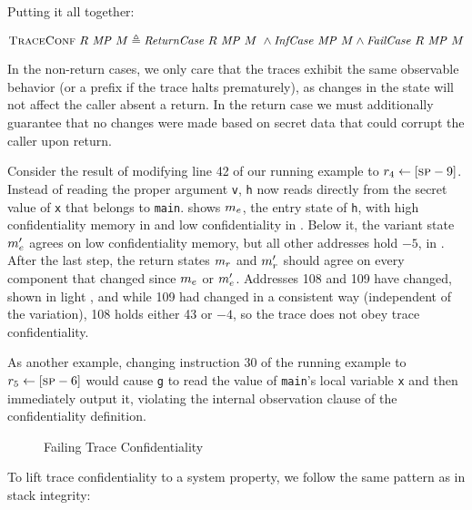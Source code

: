 \documentclass[acmsmall,review,anonymous]{acmart}\settopmatter{printfolios=true,printccs=false,printacmref=false}
\begin{document}
{Putting it all together:

\[  \text{\sc TraceConf} ~ R ~ \mathit{MP} ~ M \triangleq
   \mathit{ReturnCase} ~ R ~ \mathit{MP} ~ M ~ \land 
   \mathit{InfCase} ~ \mathit{MP} ~ M \land
    \mathit{FailCase} ~ R ~ \mathit{MP} ~ M 
\]

In the non-return cases, we only care that the traces exhibit the same
observable behavior (or a prefix if the trace halts prematurely), as changes
in the state will not affect the caller absent a return.  In the return case
we must additionally guarantee that no changes were made based on secret data
that could corrupt the caller upon return.

Consider the result of modifying line 42 of our running example to $r_4 \leftarrow [\textsc{sp} - 9]$.
Instead of reading the proper argument {\tt v}, {\tt h} now reads directly from the
secret value of {\tt x} that belongs to {\tt main}. 
shows \(m_e\), the entry state of {\tt h}, with high confidentiality memory
in {\high} and low confidentiality in {\low}. Below it, the variant state
\(m_e'\) agrees on low confidentiality memory, but all other addresses
hold $-5$, in {\varied}.  After the last step, the return states \(m_r\) and
\(m_r'\) should agree on every component that changed since \(m_e\) or
\(m_e'\). Addresses 108 and 109 have changed, shown in light {\low}, and while 109
had changed in a consistent way (independent of the variation), 108 holds either 43 or $-4$, so the trace does not obey trace confidentiality.

As another example, changing instruction 30 of the running example to
$r_5 \leftarrow [\textsc{sp} - 6]$ would cause {\tt g} to read the value of
{\tt main}'s local variable {\tt x} and then immediately output it,
violating the internal observation clause of the confidentiality
definition.

\begin{figure}
  \confidentialityendexample
  \caption{Failing Trace Confidentiality}
  \label{fig:confex}
\end{figure}

To lift trace confidentiality to a system property, we follow the same
pattern as in stack integrity:

}
\end{document}

